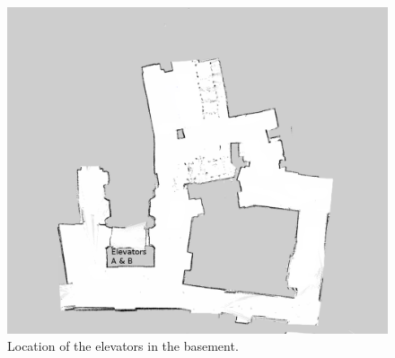 \begin{figure}[!htb]
  \centering
  \includegraphics[width=\linewidth]{images/basement_elevator.png}
  \caption{Location of the elevators in the basement. }
  \label{figure:basement_elevator}
\end{figure}

